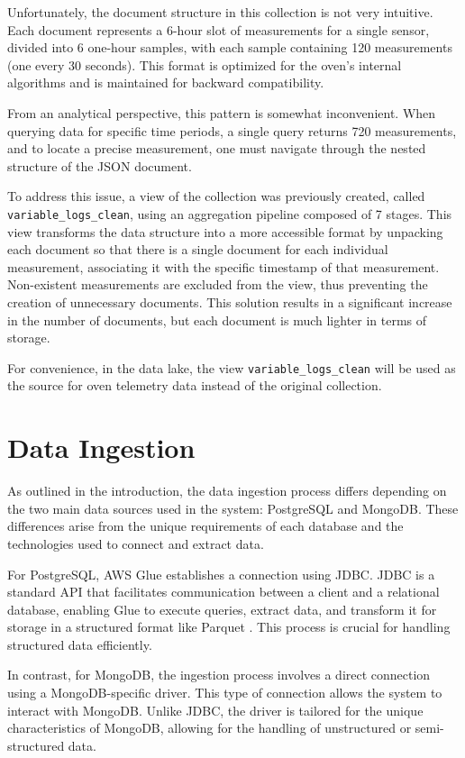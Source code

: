 Unfortunately, the document structure in this collection is not very intuitive. Each document represents a 6-hour slot of measurements for a single sensor, divided into 6 one-hour samples, with each sample containing 120 measurements (one every 30 seconds). This format is optimized for the oven's internal algorithms and is maintained for backward compatibility.

From an analytical perspective, this pattern is somewhat inconvenient. When querying data for specific time periods, a single query returns 720 measurements, and to locate a precise measurement, one must navigate through the nested structure of the \ac{JSON} document.

To address this issue, a view of the collection was previously created, called \texttt{variable\_logs\_clean}, using an aggregation pipeline composed of 7 stages. This view transforms the data structure into a more accessible format by unpacking each document so that there is a single document for each individual measurement, associating it with the specific timestamp of that measurement. Non-existent measurements are excluded from the view, thus preventing the creation of unnecessary documents. This solution results in a significant increase in the number of documents, but each document is much lighter in terms of storage.

For convenience, in the data lake, the view \texttt{variable\_logs\_clean} will be used as the source for oven telemetry data instead of the original collection.

\section{Data Ingestion}
As outlined in the introduction, the data ingestion process differs depending on the two main data sources used in the system: PostgreSQL and MongoDB. These differences arise from the unique requirements of each database and the technologies used to connect and extract data.

For PostgreSQL, \ac{AWS} Glue establishes a connection using \ac{JDBC}. \ac{JDBC} is a standard \ac{API} that facilitates communication between a client and a relational database, enabling Glue to execute queries, extract data, and transform it for storage in a structured format like Parquet \cite{glueingestion}. This process is crucial for handling structured data efficiently.

In contrast, for MongoDB, the ingestion process involves a direct connection using a MongoDB-specific driver. This type of connection allows the system to interact with MongoDB. Unlike \ac{JDBC}, the driver is tailored for the unique characteristics of MongoDB, allowing for the handling of unstructured or semi-structured data.

